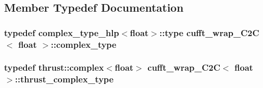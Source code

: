 \subsection{Member Typedef Documentation}
\hypertarget{classcufft__wrap__C2C_3_01float_01_4_a5774ab38d74ec0c5e5f7c8e9f077b9e9}{
\subsubsection[{complex\-\_\-type}]{\setlength{\rightskip}{0pt plus 5cm}typedef {\bf complex\-\_\-type\-\_\-hlp}$<$float$>$\-::type {\bf cufft\-\_\-wrap\-\_\-\-C2\-C}$<$ float $>$\-::{\bf complex\-\_\-type}}}\label{classcufft__wrap__C2C_3_01float_01_4_a5774ab38d74ec0c5e5f7c8e9f077b9e9}
\hypertarget{classcufft__wrap__C2C_3_01float_01_4_a6a0bfa6274f9445666985b5aef65f6c3}{
\subsubsection[{thrust\-\_\-complex\-\_\-type}]{\setlength{\rightskip}{0pt plus 5cm}typedef {\bf thrust\-::complex}$<$float$>$ {\bf cufft\-\_\-wrap\-\_\-\-C2\-C}$<$ float $>$\-::{\bf thrust\-\_\-complex\-\_\-type}}}\label{classcufft__wrap__C2C_3_01float_01_4_a6a0bfa6274f9445666985b5aef65f6c3}


